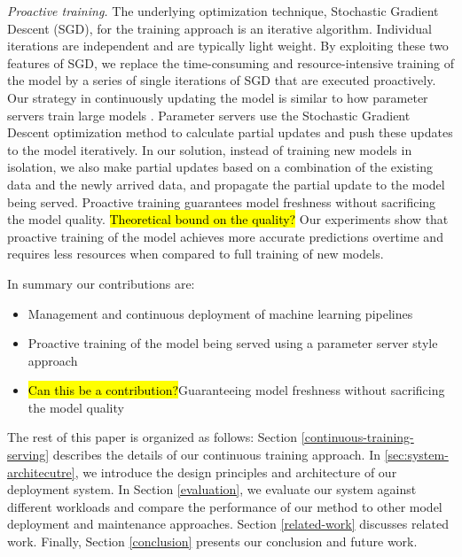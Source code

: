 \textit{Proactive training.}
The underlying optimization technique, Stochastic Gradient Descent (SGD), for the training approach is an iterative algorithm.
Individual iterations are independent and are typically light weight.
By exploiting these two features of SGD, we replace the time-consuming and resource-intensive training of the model by a series of single iterations of SGD that are executed proactively.
Our strategy in continuously updating the model is similar to how parameter servers train large models \cite{li2014scaling} .
Parameter servers use the Stochastic Gradient Descent optimization method to calculate partial updates and push these updates to the model iteratively.
In our solution, instead of training new models in isolation, we also make partial updates based on a combination of the existing data and the newly arrived data, and propagate the partial update to the model being served.
Proactive training guarantees model freshness without sacrificing the model quality.
\hl{Theoretical bound on the quality?}
Our experiments show that proactive training of the model achieves more accurate predictions overtime and requires less resources when compared to full training of new models.

In summary our contributions are:
\begin{itemize}
\item Management and continuous deployment of machine learning pipelines
\item Proactive training of the model being served using a parameter server style approach
\item \hl{Can this be a contribution?}Guaranteeing model freshness without sacrificing the model quality
\end{itemize}

The rest of this paper is organized as follows:
Section \ref{continuous-training-serving} describes the details of our continuous training approach.
In \ref{sec:system-architecutre}, we introduce the design principles and architecture of our deployment system.
In Section \ref{evaluation}, we evaluate our system against different workloads and compare the performance of our method to other model deployment and maintenance approaches. 
Section \ref {related-work} discusses related work.
Finally, Section \ref{conclusion} presents our conclusion and future work.
